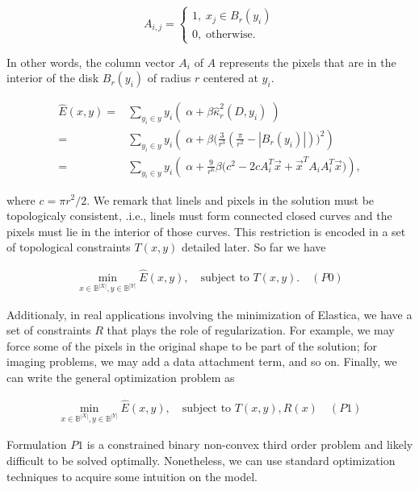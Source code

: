 \[
	A_{i,j} = \left\{ \begin{array}{ll}
		1,\; x_j \in B_{r}(y_i)\\
		0,\; \text{otherwise}.
	\end{array}\right.
\]

In other words, the column vector $A_i$ of $A$ represents the pixels that are in the interior of  the disk $B_{r}(y_i)$ of radius $r$ centered at $y_i$. 


\begin{align}
	\hat{E}(x,y) =& \sum_{y_i \in y}{ y_i \left(\; \alpha + \beta \hat{\kappa}_{r}^2(D,y_i) \; \right)}\\\nonumber
			   =& \sum_{y_i \in y}{ y_i \left(\; \alpha  + \beta \big( \frac{3}{r^3}(\frac{\pi}{r^2} - |B_r(y_i)|)\big)^2\right)}\\\nonumber
			   =& \sum_{y_i \in y}{ y_i \left(\; \alpha + \frac{9}{r^6}\beta \big(c^2 - 2cA_i^T\vec{x} + \vec{x}^TA_iA_i^T\vec{x}\big)\right)},			   
	\end{align}
	
where $c =  \pi r^2/2$. We remark that linels and pixels in the solution must be topologicaly consistent, .i.e., linels must form connected closed curves and the pixels must lie in the interior of those curves. This restriction is encoded in a set of topological constraints $T(x,y)$ detailed later. So far we have

\begin{align*}
	\min_{x \in \mathbb{B}^{|X|}, y \in \mathbb{B}^{|Y|}}{\hat{E}(x,y)}, \quad \text{subject to } T(x,y). \quad (P0)
\end{align*}

Additionaly, in real applications involving the minimization of Elastica, we have a set of constraints $R$ that plays the role of regularization. For example, we may force some of the pixels in the original shape to be part of the solution; for imaging problems, we may add a data attachment term, and so on. Finally, we can write the general optimization problem as

\begin{align*}
	\min_{x \in \mathbb{B}^{|X|}, y \in \mathbb{B}^{|Y|}}{\hat{E}(x,y)}, \quad \text{subject to } T(x,y), R(x) \quad (P1)
\end{align*}

	Formulation $P1$ is a constrained binary non-convex third order problem and likely difficult to be solved optimally. Nonetheless, we can use standard optimization techniques to acquire some intuition on the model. 	
	
